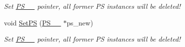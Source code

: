 \begin{DoxyCompactItemize}
\begin{DoxyCompactList}\small\item\em Set \hyperlink{classPS__2__2}{P\+S\+\_\+\_} pointer, all former P\+S instances will be deleted! \end{DoxyCompactList}\item 
\hypertarget{classintegrand__par_a1428d2933660fae425da13eafdbc806b}{}void \hyperlink{classintegrand__par_a1428d2933660fae425da13eafdbc806b}{Set\+P\+S} (\hyperlink{classPS__2__3}{P\+S\+\_\+\_} $\ast$ps\+\_\+new)\label{classintegrand__par_a1428d2933660fae425da13eafdbc806b}

\begin{DoxyCompactList}\small\item\em Set \hyperlink{classPS__2__3}{P\+S\+\_\+\_} pointer, all former P\+S instances will be deleted! \end{DoxyCompactList}\end{DoxyCompactItemize}
